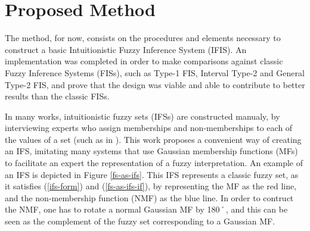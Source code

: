 \documentclass[conference]{IEEEtran}
\begin{document}
\section{Proposed Method}
\label{proposed-method}
The method, for now, consists on the procedures and elements
necessary to construct a basic Intuitionistic Fuzzy Inference System
(IFIS). %
An implementation was completed in order to make comparisons against
classic Fuzzy Inference Systems (FISs), such as Type-1 FIS, Interval
Type-2 and General Type-2 FIS, and prove that
the design was viable and able to contribute to better results than
the classic FISs.




In many works, intuitionistic fuzzy sets (IFSs) are constructed manualy,
by interviewing experts who assign memberships and
non-memberships to each of the values of a set (such as in %
\cite{davarzani2013novel}). This work proposes a convenient way of
creating an IFS, imitating many systems that use Gaussian
membership functions (MFs) to facilitate an expert the representation of a
fuzzy interpretation. An example of an IFS is depicted in
Figure \ref{fs-as-ifs}. This IFS represents a classic fuzzy set, as it
satisfies (\ref{ifs-form}) and (\ref{fs-as-ifs-if}), by representing
the MF as the red line, and the non-membership
function (NMF) as the blue line. In order to contruct the NMF, one has
to rotate a normal Gaussian MF by 180˚, and this can be seen as the
complement of the fuzzy set corresponding to a Gaussian MF.
\end{document}
